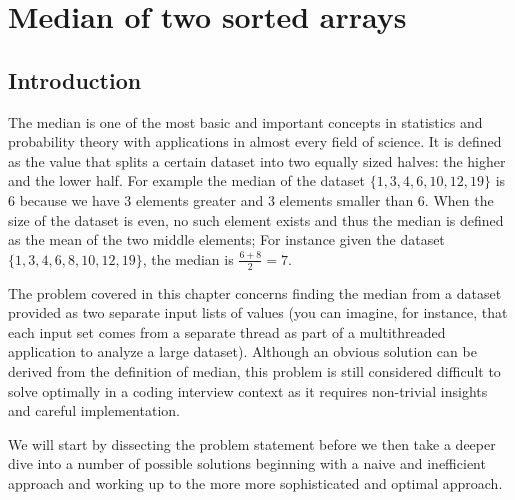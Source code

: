 %

\chapter{Median of two sorted arrays}
\label{ch:median_sorted_arrays}
\section*{Introduction}

The median is one of the most basic and important concepts in statistics and probability theory with applications in almost every field of science. It is defined as the value that splits a
certain dataset into two equally sized halves: the higher and the lower half. For example the median of the
dataset $\{1,3,4,6,10,12,19\}$ is $6$ because we have $3$ elements greater and $3$ elements smaller
than $6$. When the size of the dataset is even, no such element exists and thus the median is defined as the mean of the two middle elements;
For instance given the dataset $\{1,3,4,6,8,10,12,19\}$, the median is $\frac{6+8}{2}=7$.  

The problem covered in this chapter concerns finding the median from a dataset provided as two
separate input lists of values (you can imagine, for instance, that each input set comes from
a separate thread as part of a multithreaded application to analyze a large dataset).
Although an  obvious solution can be derived from the definition of
median, this problem is still considered difficult to solve optimally in a coding interview context
as it requires non-trivial insights and careful implementation. 

We will start by dissecting the problem statement before we then take a deeper dive into a number of possible solutions beginning with a naive and inefficient approach and working up to the more more sophisticated and optimal approach. 

